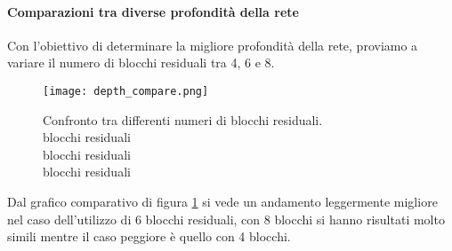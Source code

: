 \paragraph{Comparazioni tra diverse profondità della rete}
Con l'obiettivo di determinare la migliore profondità della rete, proviamo a variare il numero di blocchi residuali tra 4, 6 e 8. 
\begin{figure}[H]
    \centering
    \texttt{[image: depth\_compare.png]}
    \caption[Confronto tra differenti numeri di blocchi residuali]{
        Confronto tra differenti numeri di blocchi residuali. \\
         blocchi residuali\\
         blocchi residuali\\
         blocchi residuali
    }
    \label{depth_compare}
\end{figure}
Dal grafico comparativo di figura \ref{depth_compare} si vede un andamento leggermente migliore nel caso dell'utilizzo di 6 blocchi residuali, con 8 blocchi si hanno risultati molto simili mentre il caso peggiore è quello con 4 blocchi.